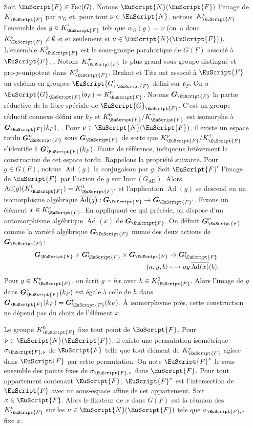 \documentclass[JEP,XML,SOM,Unicode,francais]{cedram}
\let\mathcal \EuScript
\newcommand\mto{\mathchoice{\longmapsto}{\mapsto}{\mapsto}{\mapsto}}
\newcommand{\fro}{\mathfrak{o}}
\newcommand{\AD}{\mathrm{AD}}
\newcommand{\Fac}{\mathrm{Fac}}
\newcommand{\Imm}{\mathrm{Imm}}
\DeclareMathOperator{\Ad}{Ad}
\newcommand{\bG}{\boldsymbol{G}}
\newcommand{\cF}{\mathcal{F}}
\newcommand{\cG}{\mathcal{G}}
\newcommand{\cN}{\mathcal{N}}
\theoremstyle{plain}
\theoremstyle{definition}
\begin{document}
Soit $\cF\in \Fac(G)$. Notons $\cN(\cF)$ l'image de $K_{\cF}^{\dag}$ par $w_{G}$ et, pour tout $\nu\in \cN$, notons~$K_{\cF}^{\nu}$ l'ensemble des $g\in K_{\cF}^{\dag}$ tels que $w_{G}(g)=\nu$ (on~a donc $ K_{\cF}^{\nu}\neq\emptyset$ si et seulement si $\nu\in \cN(\cF)$). L'ensemble $K_{\cF}^{0}$ est le sous-groupe parahorique de $G(F)$ associé à $\cF$, \cf \cite[Prop.\,3]{HR}. Notons $K_{\cF}^{+}$ le plus grand sous-groupe distingué et pro-$p$-unipotent dans $K_{\cF}^0$. Bruhat et Tits ont associé à $\cF$ un schéma en groupes $\cG_{\cF}$ défini sur $\fro_{F}$. On a $\cG_{\cF}(\fro_{F})=K_{\cF}^{0}$. Notons $\bG_{\cF}$ la partie réductive de la fibre spéciale de $\cG_{\cF}$. C'est un groupe réductif connexe défini sur $k_{F}$ et $K_{\cF}^0/K_{\cF}^+$ est isomorphe à $\bG_{\cF}(k_{F})$, \cf \cite[Prop.\,3.7]{HV}. Pour $\nu\in \cN(\cF)$, il existe un espace tordu $\bG_{\cF}^{\nu}$ sous $\bG_{\cF}$ de sorte que $K_{\cF}^{\nu}/K_{\cF}^{+}$ s'identifie à $\bG_{\cF}^{\nu}(k_{F})$. Faute de référence, indiquons brièvement la construction de cet espace tordu. Rappelons la propriété suivante. Pour $g\in G(F)$, notons $\Ad(g)$ la conjugaison par $g$. Soit $\cF'$ l'image de $\cF$ par l'action de $g$ sur $\Imm(G_{\AD})$. Alors $\Ad(g)(K_{\cF}^0)=K_{\cF'}^0$ et l'application $\Ad(g)$ se descend en un isomorphisme algébrique $\overline{\Ad(g)}:\bG_{\cF}\to \bG_{\cF'}$. Fixons
un élément $x\in K_{\cF}^{\nu}$. En appliquant ce qui précède, on dispose d'un automorphisme algébrique $\overline{\Ad(x)}$ de $\bG_{\cF}$. On définit $\bG_{\cF}^{\nu}$ comme la variété algébrique $\bG_{\cF}$ munie des deux actions de $\bG_{\cF}$:
\begin{align*}
\bG_{\cF}\times \bG_{\cF}^{\nu}\times \bG_{\cF}&\to\bG_{\cF}^{\nu}\\(a,y,b)&\mto ay\,\overline{\Ad(x)}(b).
\end{align*}
Pour $g\in K_{\cF}^{\nu}$, on écrit $g=hx$ avec $h\in K_{\cF}^0$. Alors l'image de $g$ dans $\bG_{\cF}^{\nu}(k_{F})$ est égale à celle de $h$ dans $\bG_{\cF}(k_{F})=\bG_{\cF}^{\nu}(k_{F})$. À isomorphisme près, cette construction ne dépend pas du choix de l'élément $x$.

Le groupe $K_{\cF}^0$ fixe tout point de $\cF$. Pour $\nu\in \cN(\cF)$, il existe une permutation isométrique $\sigma_{\cF,\nu}$ de $\cF$ telle que tout élément de $K_{\cF}^{\nu}$ agisse dans $\cF$ par cette permutation. On note $\cF^{\nu}$ le sous-ensemble des points fixes de $\sigma_{\cF,\nu}$ dans $\cF$. Pour tout appartement contenant $\cF$, $\cF^{\nu}$ est l'intersection de $\cF$ avec un sous-espace affine de cet appartement. Soit $x\in \cF$. Alors le fixateur de $x$ dans $G(F)$ est la réunion des $K_{\cF}^{\nu}$ sur les $\nu\in \cN(\cF)$ tels que $\sigma_{\cF,\nu}$ fixe $x$.
\end{document}

